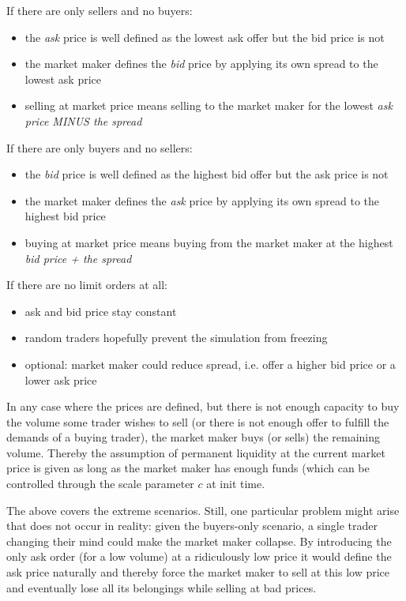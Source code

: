If there are only sellers and no buyers:
\begin{itemize}
  \item the \textit{ask} price is well defined as the lowest ask offer but the bid price is not
  \item the market maker defines the \textit{bid} price by applying its own spread to the lowest ask price
  \item selling at market price means selling to the market maker for the lowest \textit{ask price MINUS the spread}
\end{itemize}

If there are only buyers and no sellers:
\begin{itemize}
  \item the \textit{bid} price is well defined as the highest bid offer but the ask price is not
  \item the market maker defines the \textit{ask} price by applying its own spread to the highest bid price
  \item buying at market price means buying from the market maker at the highest \textit{bid price + the spread}
\end{itemize}

If there are no limit orders at all:
\begin{itemize}
  \item ask and bid price stay constant
  \item random traders hopefully prevent the simulation from freezing
  \item optional: market maker could reduce spread, i.e. offer a higher bid price
  or a lower ask price
\end{itemize}

In any case where the prices are defined, but there is not enough capacity to buy the
volume some trader wishes to sell (or there is not enough offer to fulfill the demands
of a buying trader), the market maker buys (or sells) the remaining volume. Thereby the
assumption of permanent liquidity at the current market price is given as long as the
market maker has enough funds (which can be controlled through the scale parameter $c$
at init time.

The above covers the extreme scenarios. Still, one particular problem might arise that
does not occur in reality: given the buyers-only scenario, a single trader changing
their mind could make the market maker collapse. By introducing the only ask order (for a low volume) at
a ridiculously low price it would define the ask price naturally and thereby force
the market maker to sell at this low price and eventually lose all its belongings
while selling at bad prices.

